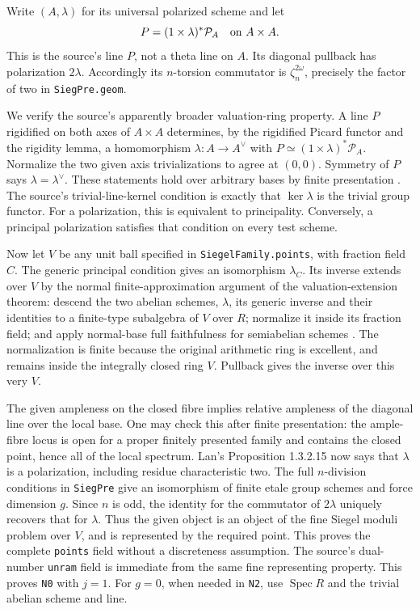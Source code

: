 Write $(A,\lambda)$ for its universal polarized scheme and let
\[
                    P=(1\times\lambda)^*\mathcal P_A
                    \quad\hbox{on } A\times A.
\]
This is the source's line $P$, not a theta line on $A$.
Its diagonal pullback has polarization $2\lambda$.  Accordingly
its $n$-torsion commutator is $\zeta_n^{2\omega}$, precisely the
factor of two in \texttt{SiegPre.geom}.

We verify the source's apparently broader valuation-ring property.
A line $P$ rigidified on both axes of $A\times A$ determines, by
the rigidified Picard functor and the rigidity lemma, a homomorphism
$\lambda:A\to A^\vee$ with $P\simeq(1\times\lambda)^*\mathcal P_A$.
Normalize the two given axis trivializations to agree at $(0,0)$.
Symmetry of $P$ says $\lambda=\lambda^\vee$.
These statements hold over arbitrary bases by finite presentation
\cite[Sections 1.3.1--1.3.2]{level-system-lan}.
The source's trivial-line-kernel condition is exactly that
$\ker\lambda$ is the trivial group functor.  For a polarization,
this is equivalent to principality.  Conversely, a principal
polarization satisfies that condition on every test scheme.

Now let $V$ be any unit ball specified in \texttt{SiegelFamily.points},
with fraction field $C$.  The generic principal condition gives
an isomorphism $\lambda_C$.  Its inverse extends over $V$ by the
normal finite-approximation argument of the valuation-extension
theorem: descend the two abelian schemes, $\lambda$, its generic
inverse and their identities to a finite-type subalgebra of $V$
over $R$; normalize it inside its fraction field; and apply
normal-base full faithfulness for semiabelian schemes
\cite[Proposition 3.3.1.5]{level-system-lan}.
The normalization is finite because the original arithmetic ring
is excellent, and remains inside the integrally closed ring $V$.
Pullback gives the inverse over this very $V$.

The given ampleness on the closed fibre implies relative ampleness
of the diagonal line over the local base.  One may check this after
finite presentation: the ample-fibre locus is open for a proper
finitely presented family and contains the closed point, hence all
of the local spectrum.  Lan's Proposition 1.3.2.15 now says that
$\lambda$ is a polarization, including residue characteristic two.
The full $n$-division conditions in \texttt{SiegPre} give an
isomorphism of finite etale group schemes and force dimension $g$.
Since $n$ is odd, the identity for the commutator of $2\lambda$
uniquely recovers that for $\lambda$.  Thus the given object is an
object of the fine Siegel moduli problem over $V$, and is represented
by the required point.  This proves the complete \texttt{points}
field without a discreteness assumption.  The source's
dual-number \texttt{unram} field is immediate from the same fine
representing property.  This proves \texttt{N0} with $j=1$.
For $g=0$, when needed in \texttt{N2}, use $\operatorname{Spec}R$
and the trivial abelian scheme and line.

